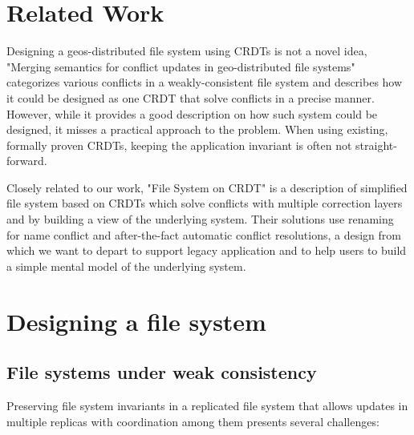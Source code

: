 \documentclass[sigconf, 10pt]{acmart}
\begin{document}
\section{Related Work}

Designing a geos-distributed file system using CRDTs is not a novel idea, "Merging semantics for conflict updates in geo-distributed file systems"\cite{tao2015merging} categorizes various conflicts in a weakly-consistent file system and describes how it could be designed as one CRDT that solve conflicts in a precise manner.
However, while it provides a good description on how such system could be designed, it misses a practical approach to the problem. When using existing, formally proven CRDTs, keeping the application invariant is often not straight-forward.

Closely related to our work, "File System on CRDT"\cite{ahmed2012file} is a description of simplified file system based on CRDTs which solve conflicts with multiple correction layers and by building a view of the underlying system. Their solutions use renaming for name conflict and after-the-fact automatic conflict resolutions, a design from which we want to depart to support legacy application and to help users to build a simple mental model of the underlying system.



\section{Designing a file system}

\subsection{File systems under weak consistency}
\label{fs:weak}

Preserving file system invariants in a replicated file system
that allows updates in multiple replicas with coordination
among them presents several challenges:
\end{document}
